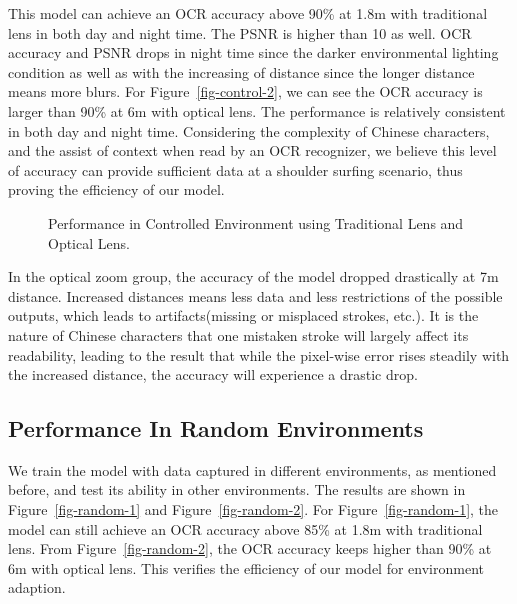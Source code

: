This model can achieve an OCR accuracy above 90\% at 1.8m with traditional lens in both day and night time. The PSNR is higher than 10 as well. OCR accuracy and PSNR drops in night time since the darker environmental lighting condition as well as with the increasing of distance since the longer distance means more blurs. For Figure~\ref{fig-control-2}, we can see the OCR accuracy is larger than 90\% at 6m with optical lens. The performance is relatively consistent in both day and night time. Considering the complexity of Chinese characters, and the assist of context when read by an OCR recognizer, we believe this level of accuracy can provide sufficient data at a shoulder surfing scenario, thus proving the efficiency of our model.
\begin{figure}[!t]
    \centering
    \hfill
    \caption{Performance in Controlled Environment using Traditional Lens and Optical Lens.}
    \label{fig:control}
\end{figure}

In the optical zoom group, the accuracy of the model dropped drastically at 7m distance. Increased distances means less data and less restrictions of the possible outputs, which leads to artifacts(missing or misplaced strokes, etc.). It is the nature of Chinese characters that one mistaken stroke will largely affect its readability, leading to the result that while the pixel-wise error rises steadily with the increased distance, the accuracy will experience a drastic drop.

\subsection{Performance In Random Environments}
We train the model with data captured in different environments, as mentioned before, and test its ability in other environments. The results are shown in Figure~\ref{fig-random-1} and Figure~\ref{fig-random-2}. For Figure~\ref{fig-random-1}, the model can still achieve an OCR accuracy above 85\% at 1.8m with traditional lens. From Figure~\ref{fig-random-2}, the OCR accuracy keeps higher than 90\% at 6m with optical lens. This verifies the efficiency of our model for environment adaption.
 

